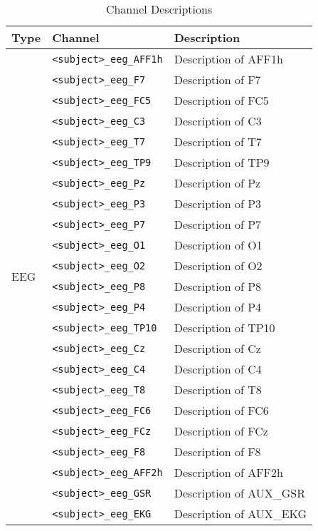 \begin{table}
\centering
\begin{tabularx}{\textwidth}{|l|l|X|}
\hline
\textbf{Type} & \textbf{Channel} & \textbf{Description} \\
\hline
\multirow{22}{*}{EEG}
& \texttt{<subject>\_eeg\_AFF1h} & Description of AFF1h \\
& \texttt{<subject>\_eeg\_F7} & Description of F7 \\
& \texttt{<subject>\_eeg\_FC5} & Description of FC5 \\
& \texttt{<subject>\_eeg\_C3} & Description of C3 \\
& \texttt{<subject>\_eeg\_T7} & Description of T7 \\
& \texttt{<subject>\_eeg\_TP9} & Description of TP9 \\
& \texttt{<subject>\_eeg\_Pz} & Description of Pz \\
& \texttt{<subject>\_eeg\_P3} & Description of P3 \\
& \texttt{<subject>\_eeg\_P7} & Description of P7 \\
& \texttt{<subject>\_eeg\_O1} & Description of O1 \\
& \texttt{<subject>\_eeg\_O2} & Description of O2 \\
& \texttt{<subject>\_eeg\_P8} & Description of P8 \\
& \texttt{<subject>\_eeg\_P4} & Description of P4 \\
& \texttt{<subject>\_eeg\_TP10} & Description of TP10 \\
& \texttt{<subject>\_eeg\_Cz} & Description of Cz \\
& \texttt{<subject>\_eeg\_C4} & Description of C4 \\
& \texttt{<subject>\_eeg\_T8} & Description of T8 \\
& \texttt{<subject>\_eeg\_FC6} & Description of FC6 \\
& \texttt{<subject>\_eeg\_FCz} & Description of FCz \\
& \texttt{<subject>\_eeg\_F8} & Description of F8 \\
& \texttt{<subject>\_eeg\_AFF2h} & Description of AFF2h \\
& \texttt{<subject>\_eeg\_GSR} & Description of AUX\_GSR \\
& \texttt{<subject>\_eeg\_EKG} & Description of AUX\_EKG \\
\hline
\end{tabularx}
\caption{Channel Descriptions}
\label{tab:EEG_channels}
\end{table}

